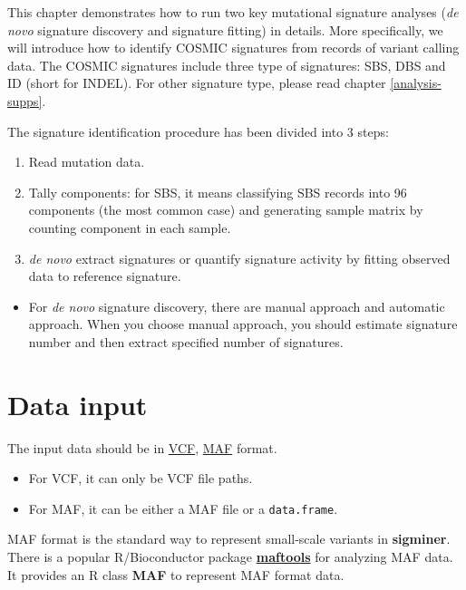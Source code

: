 \documentclass[
  12pt,
  a4paper,
  twoside]{book}
\providecommand{\tightlist}{%
  \setlength{\itemsep}{0pt}\setlength{\parskip}{0pt}}
\begin{document}
This chapter demonstrates how to run two key mutational signature analyses (\emph{de novo} signature
discovery and signature fitting) in details.
More specifically, we will introduce how to identify COSMIC signatures from records of variant calling data.
The COSMIC signatures include three type of signatures: SBS, DBS and ID (short for INDEL). For other signature type, please read chapter \ref{analysis-supps}.

The signature identification procedure has been divided into 3 steps:

\begin{enumerate}
\def\labelenumi{\arabic{enumi}.}
\tightlist
\item
  Read mutation data.
\item
  Tally components: for SBS, it means classifying SBS records into 96 components (the most common case) and generating sample matrix by counting component in each sample.
\item
  \emph{de novo} extract signatures or quantify signature activity by fitting observed
  data to reference signature.
\end{enumerate}

\begin{itemize}
\tightlist
\item
  For \emph{de novo} signature discovery, there are manual approach and automatic approach. When you choose manual approach, you should estimate signature number and then extract specified number of signatures.
\end{itemize}

\hypertarget{data-input}{%
\section{Data input}\label{data-input}}

The input data should be in \href{https://www.ebi.ac.uk/training-beta/online/courses/human-genetic-variation-introduction/variant-identification-and-analysis/understanding-vcf-format/}{VCF}, \href{https://docs.gdc.cancer.gov/Data/File_Formats/MAF_Format/}{MAF} format.

\begin{itemize}
\tightlist
\item
  For VCF, it can only be VCF file paths.
\item
  For MAF, it can be either a MAF file or a \texttt{data.frame}.
\end{itemize}

MAF format is the standard way to represent small-scale variants in \textbf{sigminer}. There is a popular R/Bioconductor package \href{https://github.com/PoisonAlien/maftools}{\textbf{maftools}} \citep{mayakonda2018maftools} for analyzing MAF data. It provides an R class \textbf{MAF} to represent MAF format data.
\end{document}
